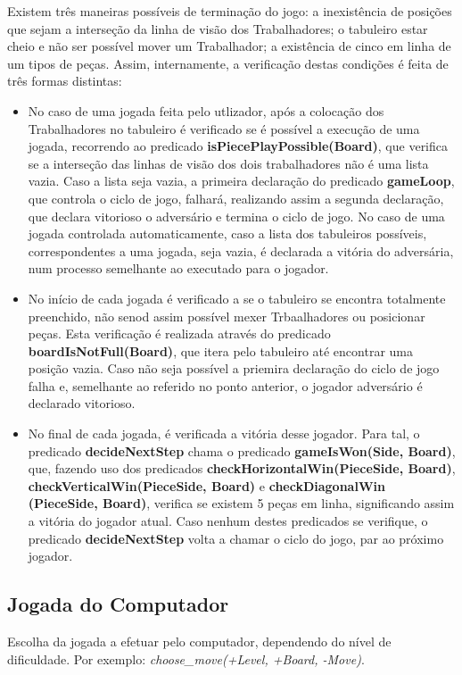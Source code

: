 \documentclass[a4paper]{article}
\begin{document}
Existem três maneiras possíveis de terminação do jogo: a inexistência  de posições que sejam a interseção da linha de visão dos Trabalhadores; o tabuleiro estar cheio e não ser possível mover um Trabalhador; a existência de cinco em linha de um tipos de peças.
Assim, internamente, a verificação destas condições é feita de três formas distintas:
\begin{itemize}
	\item No caso de uma jogada feita pelo utlizador, após a colocação dos Trabalhadores no tabuleiro é verificado se é possível a execução de uma jogada, recorrendo ao predicado \textbf{isPiecePlayPossible(Board)}, que verifica se a interseção das linhas de visão dos dois trabalhadores não é uma lista vazia. Caso a lista seja vazia, a primeira declaração do predicado \textbf{gameLoop}, que controla o ciclo de jogo, falhará, realizando assim a segunda declaração, que declara vitorioso o adversário e termina o ciclo de jogo. No caso de uma jogada controlada automaticamente, caso a lista dos tabuleiros possíveis, correspondentes a uma jogada, seja vazia, é declarada a vitória do adversária, num processo semelhante ao executado para o jogador.
	\item No início de cada jogada é verificado a se o tabuleiro se encontra totalmente preenchido, não senod assim possível mexer Trbaalhadores ou  posicionar peças. Esta verificação é realizada através do predicado \textbf{boardIsNotFull(Board)}, que itera pelo tabuleiro até encontrar uma posição vazia. Caso não seja possível a priemira declaração do ciclo de jogo falha e, semelhante ao referido no ponto anterior, o jogador adversário é declarado vitorioso.
	\item No final de cada jogada, é verificada a vitória desse jogador. Para tal, o predicado \textbf{decideNextStep} chama o predicado \textbf{gameIsWon(Side, Board)}, que, fazendo uso dos predicados \textbf{checkHorizontalWin(PieceSide, Board)}, \textbf{checkVerticalWin(PieceSide, Board)} e \textbf{checkDiagonalWin (PieceSide, Board)}, verifica se existem 5 peças em linha, significando assim a vitória do jogador atual. Caso nenhum destes predicados se verifique, o predicado \textbf{decideNextStep} volta a chamar o ciclo do jogo, par ao próximo jogador.
\end{itemize}

\newpage

\subsection{Jogada do Computador} Escolha da jogada a efetuar pelo computador, dependendo do nível de dificuldade. Por exemplo: \textit{choose\_move(+Level, +Board, -Move)}.
\end{document}
